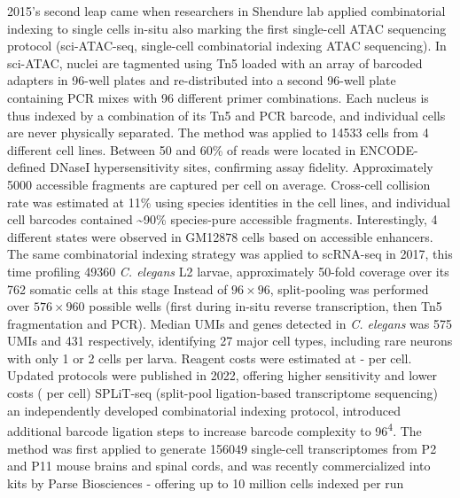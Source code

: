 

2015's second leap came when researchers in Shendure lab applied combinatorial indexing to single cells in-situ also marking the first single-cell ATAC sequencing protocol (sci-ATAC-seq, single-cell combinatorial indexing ATAC sequencing). In sci-ATAC, nuclei are tagmented using Tn5 loaded with an array of barcoded adapters in 96-well plates and re-distributed into a second 96-well plate containing PCR mixes with 96 different primer combinations. Each nucleus is thus indexed by a combination of its Tn5 and PCR barcode, and individual cells are never physically separated. The method was applied to \num{14533} cells from 4 different cell lines. Between 50 and 60\% of reads were located in ENCODE-defined DNaseI hypersensitivity sites, confirming assay fidelity. Approximately \num{5000} accessible fragments are captured per cell on average. Cross-cell collision rate was estimated at 11\% using species identities in the cell lines, and individual cell barcodes contained \textasciitilde90\% species-pure accessible fragments. Interestingly, 4 different states were observed in GM12878 cells based on accessible enhancers. The same combinatorial indexing strategy was applied to scRNA-seq in 2017, this time profiling \num{49360} \textit{C. elegans} L2 larvae, approximately 50-fold coverage over its 762 somatic cells at this stage Instead of $96 \times 96$, split-pooling was performed over $576 \times 960$ possible wells (first during in-situ reverse transcription, then Tn5 fragmentation and PCR). Median UMIs and genes detected in \textit{C. elegans} was 575 UMIs and 431 respectively, identifying 27 major cell types, including rare neurons with only 1 or 2 cells per larva. Reagent costs were estimated at - per cell. Updated protocols were published in 2022, offering higher sensitivity and lower costs ( per cell) SPLiT-seq (split-pool ligation-based transcriptome sequencing) an independently developed combinatorial indexing protocol, introduced additional barcode ligation steps to increase barcode complexity to 96\textsuperscript{4}. The method was first applied to generate \num{156049} single-cell transcriptomes from P2 and P11 mouse brains and spinal cords, and was recently commercialized into kits by Parse Biosciences - offering up to 10 million cells indexed per run

